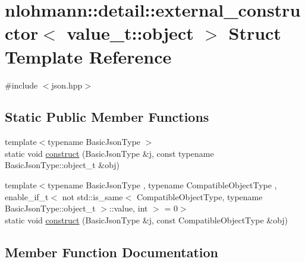 \hypertarget{structnlohmann_1_1detail_1_1external__constructor_3_01value__t_1_1object_01_4}{}\section{nlohmann\+::detail\+::external\+\_\+constructor$<$ value\+\_\+t\+::object $>$ Struct Template Reference}
\label{structnlohmann_1_1detail_1_1external__constructor_3_01value__t_1_1object_01_4}


{\ttfamily \#include $<$json.\+hpp$>$}

\subsection*{Static Public Member Functions}
\begin{DoxyCompactItemize}
\item 
{\footnotesize template$<$typename Basic\+Json\+Type $>$ }\\static void \mbox{\hyperlink{structnlohmann_1_1detail_1_1external__constructor_3_01value__t_1_1object_01_4_a3a369c5d49596dd4411e368425f9ac7a}{construct}} (Basic\+Json\+Type \&j, const typename Basic\+Json\+Type\+::object\+\_\+t \&obj)
\item 
{\footnotesize template$<$typename Basic\+Json\+Type , typename Compatible\+Object\+Type , enable\+\_\+if\+\_\+t$<$ not std\+::is\+\_\+same$<$ Compatible\+Object\+Type, typename Basic\+Json\+Type\+::object\+\_\+t $>$\+::value, int $>$  = 0$>$ }\\static void \mbox{\hyperlink{structnlohmann_1_1detail_1_1external__constructor_3_01value__t_1_1object_01_4_a91f89abe0ec4dec59099b691682ff927}{construct}} (Basic\+Json\+Type \&j, const Compatible\+Object\+Type \&obj)
\end{DoxyCompactItemize}


\subsection{Member Function Documentation}
\mbox{\label{structnlohmann_1_1detail_1_1external__constructor_3_01value__t_1_1object_01_4_a3a369c5d49596dd4411e368425f9ac7a}} 
